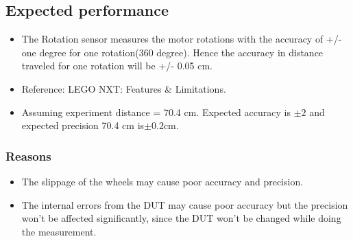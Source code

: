 \documentclass[11pt,a4paper]{article}
\begin{document}
\subsection{\textbf{Expected performance}}
\begin{itemize}
\item The Rotation sensor measures the motor rotations with the accuracy of +/- one degree for one rotation(360 degree). Hence the accuracy in distance traveled for one rotation will be +/- 0.05 cm. 
\item Reference: LEGO NXT: Features \& Limitations.
\item Assuming experiment distance = 70.4 cm. Expected accuracy is $ \pm 2$ and expected precision 70.4 cm is$ \pm 0.2$cm.
\end{itemize}

\subsubsection{Reasons}
\begin{itemize}
\item The slippage of the wheels may cause poor accuracy and precision.
\item The internal errors from the DUT may cause poor accuracy but the precision won't be affected significantly, since the DUT won't be changed while doing the measurement.
\end{itemize}
\end{document}
